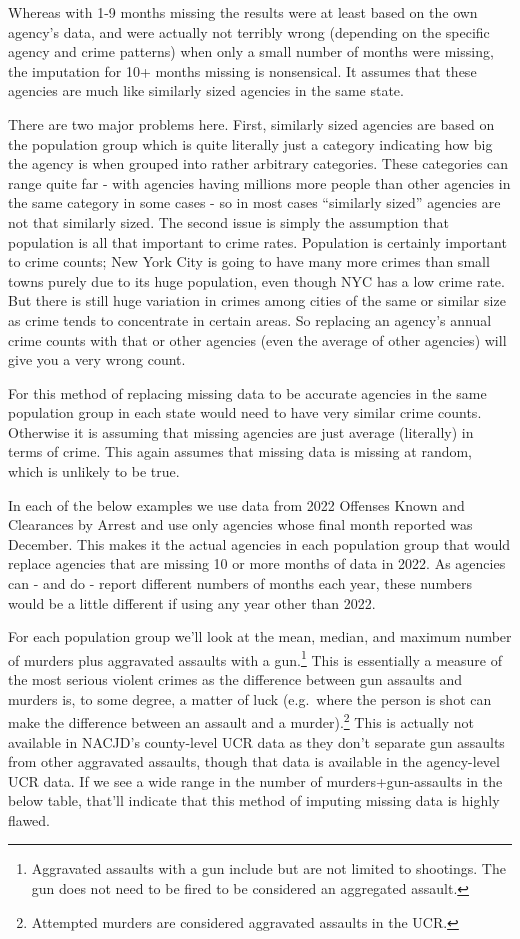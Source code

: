 \documentclass[
]{krantz}
\begin{document}
Whereas with 1-9 months missing the results were at least
based on the own agency's data, and were actually not
terribly wrong (depending on the specific agency and crime
patterns) when only a small number of months were missing,
the imputation for 10+ months missing is nonsensical. It
assumes that these agencies are much like similarly sized
agencies in the same state.

There are two major problems here. First, similarly sized
agencies are based on the population group which is quite
literally just a category indicating how big the agency is
when grouped into rather arbitrary categories. These
categories can range quite far - with agencies having
millions more people than other agencies in the same
category in some cases - so in most cases ``similarly
sized'' agencies are not that similarly sized. The second
issue is simply the assumption that population is all that
important to crime rates. Population is certainly important
to crime counts; New York City is going to have many more
crimes than small towns purely due to its huge population,
even though NYC has a low crime rate. But there is still
huge variation in crimes among cities of the same or similar
size as crime tends to concentrate in certain areas. So
replacing an agency's annual crime counts with that or other
agencies (even the average of other agencies) will give you
a very wrong count.

For this method of replacing missing data to be accurate
agencies in the same population group in each state would
need to have very similar crime counts. Otherwise it is
assuming that missing agencies are just average (literally)
in terms of crime. This again assumes that missing data is
missing at random, which is unlikely to be true.

In each of the below examples we use data from 2022 Offenses
Known and Clearances by Arrest and use only agencies whose
final month reported was December. This makes it the actual
agencies in each population group that would replace
agencies that are missing 10 or more months of data in 2022.
As agencies can - and do - report different numbers of
months each year, these numbers would be a little different
if using any year other than 2022.

For each population group we'll look at the mean, median,
and maximum number of murders plus aggravated assaults with
a gun.\footnote{Aggravated assaults with a gun include but
  are not limited to shootings. The gun does not need to be
  fired to be considered an aggregated assault.} This is
essentially a measure of the most serious violent crimes as
the difference between gun assaults and murders is, to some
degree, a matter of luck (e.g.~where the person is shot can
make the difference between an assault and a
murder).\footnote{Attempted murders are considered
  aggravated assaults in the UCR.} This is actually not
available in NACJD's county-level UCR data as they don't
separate gun assaults from other aggravated assaults, though
that data is available in the agency-level UCR data. If we
see a wide range in the number of murders+gun-assaults in
the below table, that'll indicate that this method of
imputing missing data is highly flawed.
\end{document}
